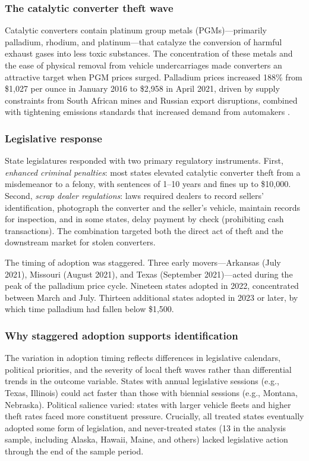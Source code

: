 \documentclass[12pt]{article}
\begin{document}
\subsubsection*{The catalytic converter theft wave} Catalytic converters contain platinum group metals (PGMs)---primarily palladium, rhodium, and platinum---that catalyze the conversion of harmful exhaust gases into less toxic substances. The concentration of these metals and the ease of physical removal from vehicle undercarriages made converters an attractive target when PGM prices surged. Palladium prices increased 188\% from \$1,027 per ounce in January 2016 to \$2,958 in April 2021, driven by supply constraints from South African mines and Russian export disruptions, combined with tightening emissions standards that increased demand from automakers \citep{johnson2022pgm}.

\subsubsection*{Legislative response} State legislatures responded with two primary regulatory instruments. First, \textit{enhanced criminal penalties}: most states elevated catalytic converter theft from a misdemeanor to a felony, with sentences of 1--10 years and fines up to \$10,000. Second, \textit{scrap dealer regulations}: laws required dealers to record sellers' identification, photograph the converter and the seller's vehicle, maintain records for inspection, and in some states, delay payment by check (prohibiting cash transactions). The combination targeted both the direct act of theft and the downstream market for stolen converters.

The timing of adoption was staggered. Three early movers---Arkansas (July 2021), Missouri (August 2021), and Texas (September 2021)---acted during the peak of the palladium price cycle. Nineteen states adopted in 2022, concentrated between March and July. Thirteen additional states adopted in 2023 or later, by which time palladium had fallen below \$1,500.

\subsubsection*{Why staggered adoption supports identification} The variation in adoption timing reflects differences in legislative calendars, political priorities, and the severity of local theft waves rather than differential trends in the outcome variable. States with annual legislative sessions (e.g., Texas, Illinois) could act faster than those with biennial sessions (e.g., Montana, Nebraska). Political salience varied: states with larger vehicle fleets and higher theft rates faced more constituent pressure. Crucially, all treated states eventually adopted some form of legislation, and never-treated states (13 in the analysis sample, including Alaska, Hawaii, Maine, and others) lacked legislative action through the end of the sample period.
\end{document}

